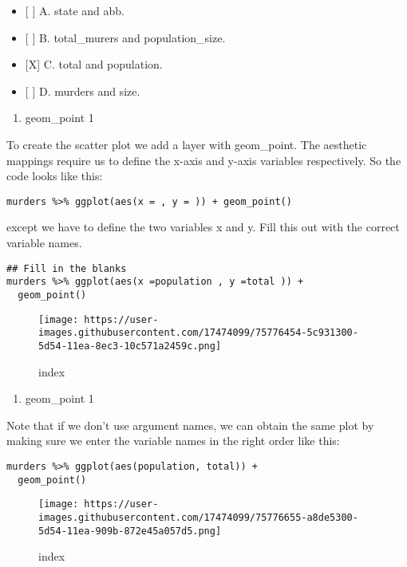 \documentclass[]{article}
\providecommand{\tightlist}{%
  \setlength{\itemsep}{0pt}\setlength{\parskip}{0pt}}
\begin{document}
\begin{itemize}
\tightlist
\item
  {[} {]} A. state and abb.
\item
  {[} {]} B. total\_murers and population\_size.
\item
  {[}X{]} C. total and population.
\item
  {[} {]} D. murders and size.
\end{itemize}

\begin{enumerate}
\def\labelenumi{\arabic{enumi}.}
\setcounter{enumi}{4}
\tightlist
\item
  geom\_point 1
\end{enumerate}

To create the scatter plot we add a layer with geom\_point. The
aesthetic mappings require us to define the x-axis and y-axis variables
respectively. So the code looks like this:

\begin{verbatim}
murders %>% ggplot(aes(x = , y = )) + geom_point()
\end{verbatim}

except we have to define the two variables x and y. Fill this out with
the correct variable names.

\begin{verbatim}
## Fill in the blanks
murders %>% ggplot(aes(x =population , y =total )) +
  geom_point()
\end{verbatim}

\begin{figure}
\centering
\texttt{[image: https://user-images.githubusercontent.com/17474099/75776454-5c931300-5d54-11ea-8ec3-10c571a2459c.png]}
\caption{index}
\end{figure}

\begin{enumerate}
\def\labelenumi{\arabic{enumi}.}
\setcounter{enumi}{5}
\tightlist
\item
  geom\_point 1
\end{enumerate}

Note that if we don't use argument names, we can obtain the same plot by
making sure we enter the variable names in the right order like this:

\begin{verbatim}
murders %>% ggplot(aes(population, total)) +
  geom_point()
\end{verbatim}

\begin{figure}
\centering
\texttt{[image: https://user-images.githubusercontent.com/17474099/75776655-a8de5300-5d54-11ea-909b-872e45a057d5.png]}
\caption{index}
\end{figure}
\end{document}
